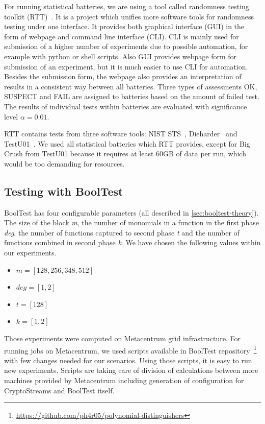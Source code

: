 \documentclass[
    digital,    %
    oneside,    %
    color,
    11pt,
    nocover,
    notable,
    nolof,
    nolot,
    final
]{fithesis3}
\renewcommand\_{\textunderscore\allowbreak}
\begin{document}
For running statistical batteries, we are using a tool called randomness testing toolkit (RTT)~\cite{Obratil2017thesis}. It is a project which unifies more software tools for randomness testing under one interface. It provides both graphical interface (GUI) in the form of webpage and command line interface (CLI). CLI is mainly used for submission of a higher number of experiments due to possible automation, for example with python or shell scripts. Also GUI provides webpage form for submission of an experiment, but it is much easier to use CLI for automation. Besides the submission form, the webpage also provides an interpretation of results in a consistent way between all batteries. Three types of assessments OK, SUSPECT and FAIL are assigned to batteries based on the amount of failed test. The results of individual tests within batteries are evaluated with significance level $\alpha = 0.01$.

RTT contains tests from three software tools: {NIST STS}~\cite{nist-sts}, Dieharder~\cite{dieharder} and TestU01~\cite{l2007testu01}. We used all statistical batteries which RTT provides, except for Big Crush from TestU01 because it requires at least 60GB of data per run, which would be too demanding for resources. 

\subsection{Testing with BoolTest}
\label{sec:testing_booltest}

BoolTest has four configurable parameters (all described in \cref{sec:booltest-theory}). The size of the block \textit{m}, the number of monomials in a function in the first phase \textit{deg}, the number of functions captured to second phase \textit{t} and the number of functions combined in second phase \textit{k}. We have chosen the following values within our experiments.

\begin{itemize}
	\item $m = [128, 256, 348, 512]$ 
	\item $deg = [1, 2]$
	\item $t = [128]$
	\item $k = [1, 2]$
\end{itemize}

Those experiments were computed on Metacentrum grid infrastructure. For running jobs on Metacentrum, we used scripts available in BoolTest repository~\footnote{\url{https://github.com/ph4r05/polynomial-distinguishers}} with few changes needed for our scenarios. Using those scripts, it is easy to run new experiments. Scripts are taking care of division of calculations between more machines provided by Metacentrum including generation of configuration for CryptoStreams and BoolTest itself. 
\end{document}
